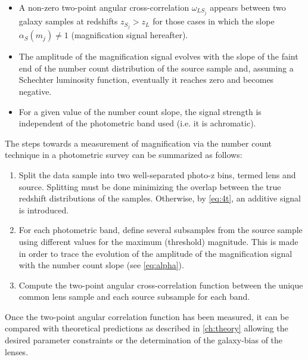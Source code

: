 \begin{itemize}
  \item A non-zero two-point angular cross-correlation $\omega_{LS_j}$ appears between two galaxy samples at redshifts $z_{S_j} > z_L$ for those cases in which the slope $\alpha_S(m_j) \neq 1$ (magnification signal hereafter).
  \item The amplitude of the magnification signal evolves with the slope of the faint end of the number count distribution of the source sample and, assuming a Schechter \cite{1976ApJ...203..297S} luminosity function, eventually it reaches zero and becomes negative.
  \item For a given value of the number count slope, the signal strength is independent of the photometric band used (i.e. it is achromatic).
\end{itemize}

The steps towards a measurement of magnification via the number count technique in a photometric survey can be summarized as follows:
\begin{enumerate}
	\item Split the data sample into two well-separated photo-z bins, termed lens and source.
	Splitting must be done minimizing the overlap between the true redshift distributions of the samples. Otherwise, by \autoref{eq:4t}, an additive signal is introduced.
	\item For each photometric band, define several subsamples from the source sample using different values for the maximum (threshold) magnitude. This is made in order to trace the evolution of the amplitude of the magnification signal with the number count slope (see \autoref{eq:alpha}).
	\item Compute the two-point angular cross-correlation function between the unique common lens sample and each source subsample for each band.
\end{enumerate}
Once the two-point angular correlation function has been measured, it can be compared with theoretical predictions as described in \autoref{ch:theory} allowing the desired parameter constraints or the determination of the galaxy-bias of the lenses.
\newline

